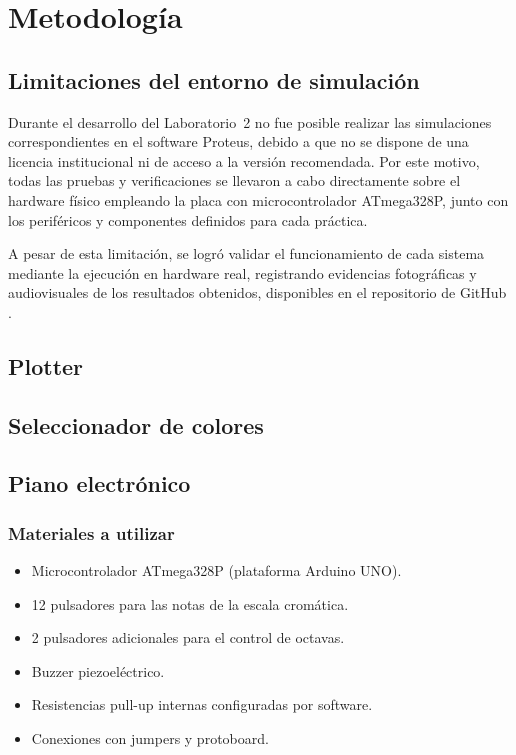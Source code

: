 \newpage

\section{Metodología}

\subsection{Limitaciones del entorno de simulación}

Durante el desarrollo del Laboratorio~2 no fue posible realizar las simulaciones correspondientes en el software Proteus, debido a que no se dispone de una licencia institucional ni de acceso a la versión recomendada. Por este motivo, todas las pruebas y verificaciones se llevaron a cabo directamente sobre el hardware físico empleando la placa con microcontrolador ATmega328P, junto con los periféricos y componentes definidos para cada práctica.

A pesar de esta limitación, se logró validar el funcionamiento de cada sistema mediante la ejecución en hardware real, registrando evidencias fotográficas y audiovisuales de los resultados obtenidos, disponibles en el repositorio de GitHub \cite{github_evidencias_lab2}.

\subsection{Plotter}

\subsection{Seleccionador de colores}

\subsection{Piano electrónico}

\subsubsection{Materiales a utilizar}
\begin{itemize}
    \item Microcontrolador ATmega328P (plataforma Arduino UNO).
    \item 12 pulsadores para las notas de la escala cromática.
    \item 2 pulsadores adicionales para el control de octavas.
    \item Buzzer piezoeléctrico.
    \item Resistencias pull-up internas configuradas por software.
    \item Conexiones con jumpers y protoboard.
\end{itemize}


